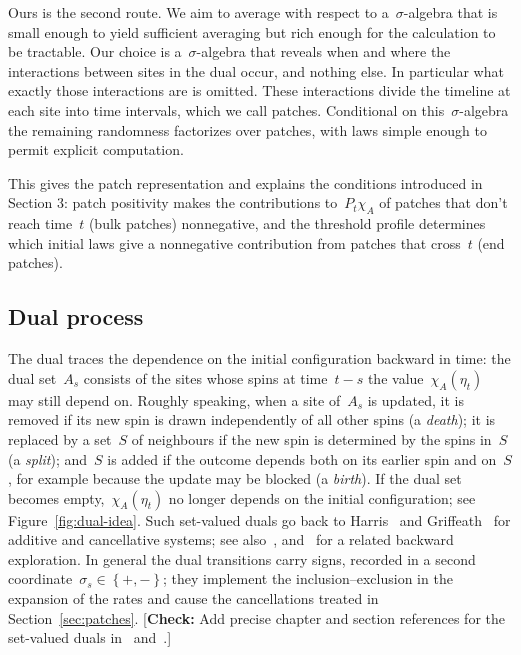 \documentclass[EJP,preprint,NODS,nobera]{ejpecp}
\newcommand{\cb}[1]{\left\{#1\right\}}
\newcommand{\authorcheck}[1]{{\color{blue}[\textbf{Check:} #1]}}
\begin{document}
Ours is the second route. We aim to average with respect to a~$\sigma$-algebra that is small enough to yield sufficient averaging but rich enough for the calculation to be tractable. Our choice is a~$\sigma$-algebra that reveals when and where the interactions between sites in the dual occur, and nothing else. In particular what exactly those interactions are is omitted. These interactions divide the timeline at each site into time intervals, which we call patches. Conditional on this~$\sigma$-algebra the remaining randomness factorizes over patches, with laws simple enough to permit explicit computation.

This gives the patch representation and explains the conditions introduced in Section 3: patch positivity makes the contributions to~$P_t\chi_A$ of patches that don't reach time~$t$ (bulk patches) nonnegative, and the threshold profile determines which initial laws give a nonnegative contribution from patches that cross~$t$ (end patches). 

\subsection{Dual process}
\label{sec:dual}

The dual traces the dependence on the initial configuration backward in
time: the dual set~$A_s$ consists of the sites whose spins at time~$t-s$ the
value~$\chi_A(\eta_t)$ may still depend on. Roughly speaking, when a site
of~$A_s$ is updated, it is removed if its new spin is drawn independently of
all other spins (a \emph{death}); it is replaced by a set~$S$ of neighbours
if the new spin is determined by the spins in~$S$ (a \emph{split}); and~$S$
is added if the outcome depends both on its earlier spin and on~$S$, for
example because the update may be blocked (a \emph{birth}). If the dual set
becomes empty,~$\chi_A(\eta_t)$ no longer depends on the initial
configuration; see Figure~\ref{fig:dual-idea}. Such set-valued duals go back
to Harris~\cite{Harris1978} and Griffeath~\cite{Griffeath1979} for additive
and cancellative systems; see also~\cite{Liggett1985,Gray1986,JansenKurt2014},
and~\cite{LubetzkySly2016} for a related backward exploration. In general the
dual transitions carry signs, recorded in a second
coordinate~$\sigma_s\in\cb{+,-}$; they implement the inclusion--exclusion in
the expansion of the rates and cause the cancellations treated in
Section~\ref{sec:patches}.
\authorcheck{Add precise chapter and section references for the set-valued
duals in~\cite{Liggett1985} and~\cite{Griffeath1979}.}
\end{document}
